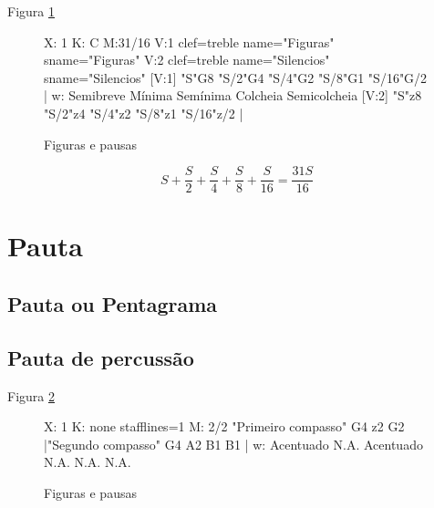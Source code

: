 Figura \ref{fig:abc-figuraspausas}
\begin{figure}[H]
\centering
\begin{abc}[name=abc-figuraspausas]
%
X: 1 %
K: C %
M:31/16
V:1 clef=treble name="Figuras"   sname="Figuras"
V:2 clef=treble name="Silencios" sname="Silencios"
%
[V:1] "S"G8  "S/2"G4  "S/4"G2  "S/8"G1 "S/16"G/2           |
w:    Semibreve Mínima Semínima Colcheia Semicolcheia        
%
[V:2] "S"z8 "S/2"z4 "S/4"z2  "S/8"z1  "S/16"z/2   |
%       
\end{abc}
\caption{Figuras e pausas}
\label{fig:abc-figuraspausas}
\end{figure}

\begin{equation}
S+\frac{S}{2}+\frac{S}{4}+\frac{S}{8}+\frac{S}{16} =\frac{31S}{16}
\end{equation}



\section{Pauta}

\subsection{Pauta ou Pentagrama}
\subsection{Pauta de percussão}


Figura \ref{fig:abc-monolinearperc}
\begin{figure}[H]
\centering
\begin{abc}[name=abc-monolinearperc]
%
X: 1 %
K: none stafflines=1 %
M: 2/2 %
"Primeiro compasso"  G4 z2 G2 |"Segundo compasso" G4 A2 B1 B1  |
w:  Acentuado   N.A. Acentuado N.A. N.A. N.A.
\end{abc}
\caption{Figuras e pausas}
\label{fig:abc-monolinearperc}
\end{figure}





